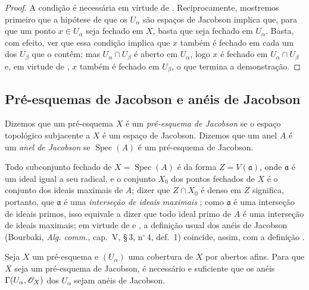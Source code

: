 \begin{proof}
A condição é necessária em virtude de .
Reciprocamente, mostremos primeiro que a hipótese de que os $U_\alpha$ são espaços de Jacobson implica que, para que um ponto $x\in U_\alpha$ seja fechado em $X$, basta que seja fechado em $U_\alpha$.
Basta, com efeito, ver que essa condição implica que $x$ também é fechado em cada um dos $U_\beta$ que o contêm; mas $U_\alpha\cap U_\beta$ é aberto em $U_\alpha$, logo $x$ é fechado em $U_\alpha\cap U_\beta$ e, em virtude de , $x$ também é fechado em $U_\beta$, o que termina a demonstração.
\end{proof}

\subsection{Pré-esquemas de Jacobson e anéis de Jacobson}
\label{subsection:IV.10.4}

\begin{definition}[10.4.1]
\label{IV.10.4.1}
Dizemos que um pré-esquema $X$ é um \emph{pré-esquema de Jacobson} se o espaço topológico subjacente a $X$ é um espaço de Jacobson.
Dizemos que um anel $A$ é um \emph{anel de Jacobson} se $\operatorname{Spec}(A)$ é um pré-esquema de Jacobson.
\end{definition}

Todo subconjunto fechado de $X=\operatorname{Spec}(A)$ é da forma $Z=V(\mathfrak{a})$, onde $\mathfrak{a}$ é um ideal igual a seu radical, e o conjunto $X_0$ dos pontos fechados de $X$ é o conjunto dos ideais maximais de $A$; dizer que $Z\cap X_0$ é denso em $Z$ significa, portanto, que $\mathfrak{a}$ é uma \emph{interseção de ideais maximais} ; como $\mathfrak{a}$ é uma interseção de ideais primos, isso equivale a dizer que todo ideal primo de $A$ é uma interseção de ideais maximais; em virtude de  e , a definição usual dos anéis de Jacobson (Bourbaki, \emph{Alg. comm.}, cap.~V, \S\,3, n$^\circ$\,4, def.~1) coincide, assim, com a definição .

\begin{proposition}[10.4.2]
\label{IV.10.4.2}
Seja $X$ um pré-esquema e $(U_\alpha)$ uma cobertura de $X$ por abertos afins.
Para que $X$ seja um pré-esquema de Jacobson, é necessário e suficiente que os anéis $\Gamma(U_\alpha,\mathscr{O}_X)$ dos $U_\alpha$ sejam anéis de Jacobson.
\end{proposition}

